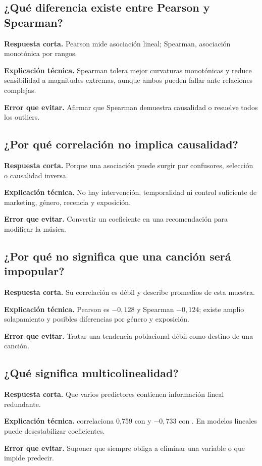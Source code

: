 \subsection*{¿Qué diferencia existe entre Pearson y Spearman?}
\textbf{Respuesta corta.} Pearson mide asociación lineal; Spearman, asociación monotónica por
rangos.\par
\textbf{Explicación técnica.} Spearman tolera mejor curvaturas monotónicas y reduce sensibilidad a
magnitudes extremas, aunque ambos pueden fallar ante relaciones complejas.\par
\textbf{Error que evitar.} Afirmar que Spearman demuestra causalidad o resuelve todos los outliers.

\subsection*{¿Por qué correlación no implica causalidad?}
\textbf{Respuesta corta.} Porque una asociación puede surgir por confusores, selección o causalidad
inversa.\par
\textbf{Explicación técnica.} No hay intervención, temporalidad ni control suficiente de marketing,
género, recencia y exposición.\par
\textbf{Error que evitar.} Convertir un coeficiente en una recomendación para modificar la música.

\subsection*{¿Por qué  no significa que una canción será impopular?}
\textbf{Respuesta corta.} Su correlación es débil y describe promedios de esta muestra.\par
\textbf{Explicación técnica.} Pearson es $-0{,}128$ y Spearman $-0{,}124$; existe amplio solapamiento
y posibles diferencias por género y exposición.\par
\textbf{Error que evitar.} Tratar una tendencia poblacional débil como destino de una canción.

\subsection*{¿Qué significa multicolinealidad?}
\textbf{Respuesta corta.} Que varios predictores contienen información lineal redundante.\par
\textbf{Explicación técnica.}  correlaciona 0,759 con  y $-0{,}733$ con
. En modelos lineales puede desestabilizar coeficientes.\par
\textbf{Error que evitar.} Suponer que siempre obliga a eliminar una variable o que impide predecir.

